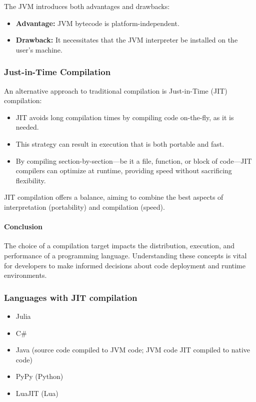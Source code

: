 \documentclass[12pt]{article}
\begin{document}
The JVM introduces both advantages and drawbacks:

\begin{itemize}
  \item \textbf{Advantage:} JVM bytecode is platform-independent.
  \item \textbf{Drawback:} It necessitates that the JVM interpreter be installed on the user's machine.
\end{itemize}

\subsubsection{Just-in-Time Compilation}

An alternative approach to traditional compilation is Just-in-Time (JIT) compilation:

\begin{itemize}
  \item JIT avoids long compilation times by compiling code on-the-fly, as it is needed.
  \item This strategy can result in execution that is both portable and fast.
  \item By compiling section-by-section—be it a file, function, or block of code—JIT compilers can optimize at runtime, providing speed without sacrificing flexibility.
\end{itemize}

JIT compilation offers a balance, aiming to combine the best aspects of interpretation (portability) and compilation (speed).

\paragraph{Conclusion}

The choice of a compilation target impacts the distribution, execution, and performance of a programming language. Understanding these concepts is vital for developers to make informed decisions about code deployment and runtime environments.


\subsubsection{Languages with JIT compilation}

\begin{itemize}
    \item Julia
    \item C\#
    \item Java (source code compiled to JVM code; JVM code JIT compiled to native code)
    \item PyPy (Python)
    \item LuaJIT (Lua)
\end{itemize}
\end{document}
